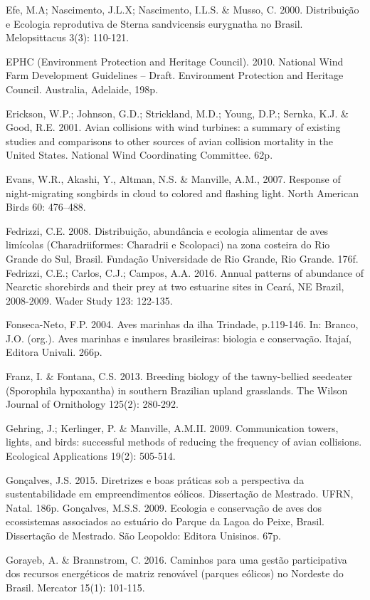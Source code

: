 \documentclass[
  oneside]{scrbook}
\begin{document}
Efe, M.A; Nascimento, J.L.X; Nascimento, I.L.S. \& Musso, C. 2000. Distribuição e Ecologia reprodutiva de Sterna sandvicensis eurygnatha no Brasil. Melopsittacus 3(3): 110-121.

EPHC (Environment Protection and Heritage Council). 2010. National Wind Farm Development Guidelines -- Draft. Environment Protection and Heritage Council. Australia, Adelaide, 198p.

Erickson, W.P.; Johnson, G.D.; Strickland, M.D.; Young, D.P.; Sernka, K.J. \& Good, R.E. 2001. Avian collisions with wind turbines: a summary of existing studies and comparisons to other sources of avian collision mortality in the United States. National Wind Coordinating Committee. 62p.

Evans, W.R., Akashi, Y., Altman, N.S. \& Manville, A.M., 2007. Response of night-migrating songbirds in cloud to colored and flashing light. North American Birds 60: 476--488.

Fedrizzi, C.E. 2008. Distribuição, abundância e ecologia alimentar de aves limícolas (Charadriiformes: Charadrii e Scolopaci) na zona costeira do Rio Grande do Sul, Brasil. Fundação Universidade de Rio Grande, Rio Grande. 176f.
Fedrizzi, C.E.; Carlos, C.J.; Campos, A.A. 2016. Annual patterns of abundance of Nearctic shorebirds and their prey at two estuarine sites in Ceará, NE Brazil, 2008-2009. Wader Study 123: 122-135.

Fonseca-Neto, F.P. 2004. Aves marinhas da ilha Trindade, p.119-146. In: Branco, J.O. (org.). Aves marinhas e insulares brasileiras: biologia e conservação. Itajaí, Editora Univali. 266p.

Franz, I. \& Fontana, C.S. 2013. Breeding biology of the tawny-bellied seedeater (Sporophila hypoxantha) in southern Brazilian upland grasslands. The Wilson Journal of Ornithology 125(2): 280-292.

Gehring, J.; Kerlinger, P. \& Manville, A.M.II. 2009. Communication towers, lights, and birds: successful methods of reducing the frequency of avian collisions. Ecological Applications 19(2): 505-514.

Gonçalves, J.S. 2015. Diretrizes e boas práticas sob a perspectiva da sustentabilidade em empreendimentos eólicos. Dissertação de Mestrado. UFRN, Natal. 186p.
Gonçalves, M.S.S. 2009. Ecologia e conservação de aves dos ecossistemas associados ao estuário do Parque da Lagoa do Peixe, Brasil. Dissertação de Mestrado. São Leopoldo: Editora Unisinos. 67p.

Gorayeb, A. \& Brannstrom, C. 2016. Caminhos para uma gestão participativa dos recursos energéticos de matriz renovável (parques eólicos) no Nordeste do Brasil. Mercator 15(1): 101-115.
\end{document}
